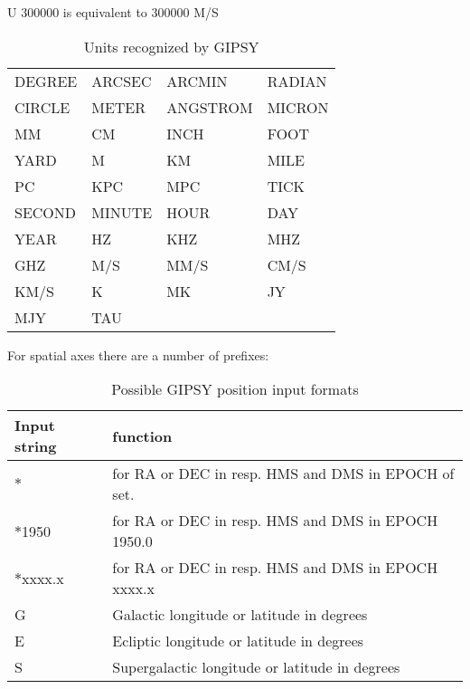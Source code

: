 U 300000 is equivalent to 300000 M/S
\\

\begin{table}
\begin{center}
\begin{tabular}{ | l l l l | }
\hline

        DEGREE &     ARCSEC &     ARCMIN   &   RADIAN \\
        CIRCLE &     METER  &     ANGSTROM &   MICRON \\
        MM     &     CM     &     INCH     &   FOOT \\
        YARD   &     M      &     KM       &   MILE \\
        PC     &     KPC    &     MPC      &   TICK \\
        SECOND &     MINUTE &     HOUR     &   DAY \\
        YEAR   &     HZ     &     KHZ      &   MHZ \\
        GHZ    &     M/S    &     MM/S     &   CM/S \\
        KM/S   &     K      &     MK       &   JY \\
        MJY    &     TAU    &              &      \\
\hline
\end{tabular}
\label{tab:units}
\caption{Units recognized by GIPSY}
\end{center}
\end{table}

For spatial axes there are a number of prefixes:

\begin{table}
\begin{center}
\begin{tabular}{ | l l | }
\hline
Input string  & function \\
\hline
$\ast$       & for RA or DEC in resp. HMS and DMS in EPOCH of set. \\
$\ast$1950   & for RA or DEC in resp. HMS and DMS in EPOCH 1950.0 \\
$\ast$xxxx.x & for RA or DEC in resp. HMS and DMS in EPOCH xxxx.x \\
G            & Galactic longitude or latitude in degrees \\
E            & Ecliptic longitude or latitude in degrees \\
S            & Supergalactic longitude or latitude in degrees \\
\hline
\end{tabular}
\label{tab:inputs}
\caption{Possible GIPSY position input formats}
\end{center}
\end{table}


